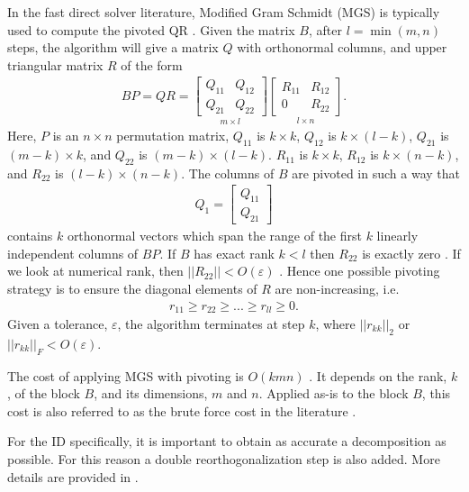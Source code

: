 \documentclass{sfuthesis}
\begin{document}
In the fast direct solver literature, Modified Gram Schmidt (MGS) is typically used to compute the pivoted QR \cite{ChengEtAl2005, GillYoungMart2012, MartRokh2005}. Given the matrix $B$, after $l=\min(m,n)$ steps, the algorithm will give a matrix $Q$ with orthonormal columns, and upper triangular matrix $R$ of the form
\begin{align*}
	B P=QR=\underset{m\times l}{\left[ \begin{array}{cc}
	Q_{11} & Q_{12}\\
	Q_{21} & Q_{22} \end{array} \right]}
	\underset{l \times n}{\left[ \begin{array}{cc}
	R_{11} & R_{12}\\
	0 & R_{22} \end{array} \right]}.
\end{align*}
Here, $P$ is an $n\times n$ permutation matrix, $Q_{11}$ is $k\times k$, $Q_{12}$ is $k\times (l-k)$, $Q_{21}$ is $(m-k) \times k$, and $Q_{22}$ is $(m-k)\times (l-k)$. $R_{11}$ is $k\times k$, $R_{12}$ is $k\times (n-k)$, and $R_{22}$ is $(l-k)\times (n-k)$. 
The columns of $B$ are pivoted in such a way that 
\begin{align*}
	Q_1=\left[ \begin{array}{c}
	Q_{11} \\
	Q_{21} \end{array} \right]
\end{align*} 
contains $k$ orthonormal vectors which span the range of the first $k$ linearly independent columns of $B P$. 
If $B$ has exact rank $k<l$ then $R_{22}$ is exactly zero \cite{Tref97, Bjorck96}. If we look at numerical rank, then $||R_{22}||<O(\varepsilon)$ \cite{Bjorck96, Dax2000, GuEis96}.
Hence one possible pivoting strategy \cite{Bjorck96, Dax2000} is to ensure the diagonal elements of $R$ are non-increasing, i.e.
\begin{align*}
	r_{11}\geq r_{22} \geq ... \geq r_{ll} \geq 0.
\end{align*}
Given a tolerance, $\varepsilon$, the algorithm terminates at step $k$, where ${||r_{kk}||}_2$ or ${||r_{kk}||}_F<O(\varepsilon)$. 

The cost of applying MGS with pivoting is $O(kmn)$ \cite{ChengEtAl2005, MartRokh2005}. It depends on the rank, $k$, of the block $B$, and its dimensions, $m$ and $n$. Applied as-is to the block $B$, this cost is also referred to as the brute force cost in the literature \cite{CBMS, CBMScode}. 

For the ID specifically, it is important to obtain as accurate a decomposition as possible. For this reason a double reorthogonalization step is also added. More details are provided in \cite{ChengEtAl2005, Bjorck94, Dax2000}. 
\end{document}
